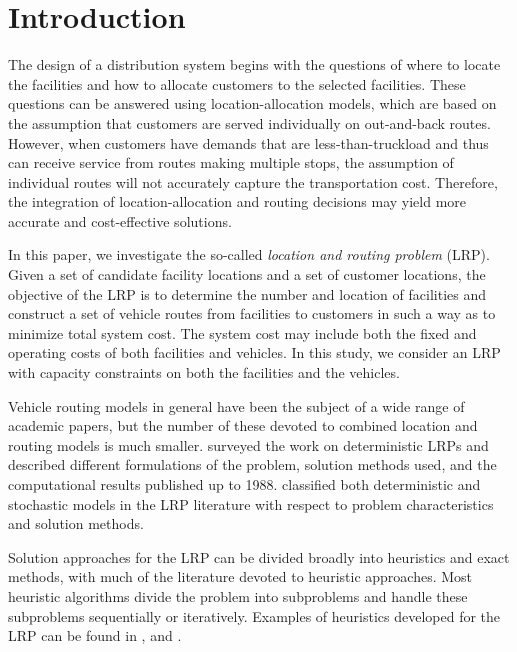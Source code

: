 

\section {Introduction}
The design of a distribution system begins with the questions of where
to locate the facilities and how to allocate customers to the selected
facilities. These questions can be answered
using location-allocation models, which are based on the assumption that
customers are served individually on out-and-back routes. However, when
customers have demands that are
less-than-truckload and thus can receive service from routes
making multiple stops, the assumption of individual routes will not
accurately capture the transportation cost. Therefore, the integration
of location-allocation and routing decisions may yield more accurate
and cost-effective solutions.

In this paper, we investigate the so-called \emph{location and routing
problem} (LRP). Given a set of candidate facility locations and a set
of customer locations, the objective of the LRP is to determine the
number and location of facilities and construct a set of vehicle
routes from facilities to customers in such a way as to minimize total
system cost. The system cost may include both the fixed and operating
costs of both facilities and vehicles. In this study, we consider an
LRP with capacity constraints on both the facilities and the vehicles.

Vehicle routing models in general have been the subject of a wide range of
academic papers, but the number of these devoted to combined location and
routing models is much smaller. \citet{Laporte} surveyed the work on
deterministic LRPs and described different formulations of the problem,
solution methods used, and the computational results published up to 1988.
\citet{Min} classified both deterministic and stochastic models in the LRP
literature with respect to problem characteristics and solution methods. 

Solution approaches for the LRP can be divided broadly into heuristics
and exact methods, with much of the literature devoted to heuristic
approaches. Most heuristic algorithms divide the problem into
subproblems and handle these subproblems sequentially or iteratively.
Examples of heuristics developed for the LRP can be found in
\citet{Perl}, \citet{Hansen} and \citet{Barreto07}. 

